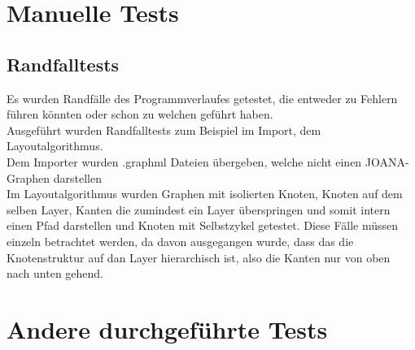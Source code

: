 \section{Manuelle Tests}

\subsection{Randfalltests}
Es wurden Randfälle des Programmverlaufes getestet, die entweder zu Fehlern führen könnten oder schon zu welchen geführt haben.\\
Ausgeführt wurden Randfalltests zum Beispiel im Import, dem Layoutalgorithmus.\\
Dem Importer wurden .graphml Dateien übergeben, welche nicht einen JOANA-Graphen darstellen\\
Im Layoutalgorithmus wurden Graphen mit isolierten Knoten, Knoten auf dem selben Layer, Kanten die zumindest ein Layer überspringen und somit intern einen Pfad darstellen und Knoten mit Selbstzykel getestet. Diese Fälle müssen einzeln betrachtet werden, da davon ausgegangen wurde, dass das die Knotenstruktur auf dan Layer hierarchisch ist, also die Kanten nur von oben nach unten gehend.\\


\section{Andere durchgeführte Tests}
